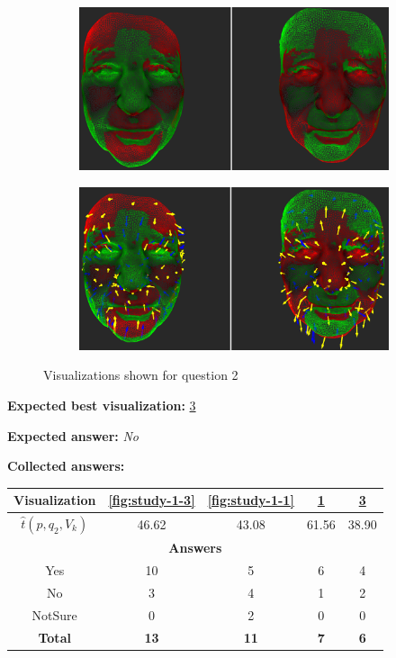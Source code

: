 \begin{figure}[h]
\begin{subfigure}{0.49\textwidth}
\includegraphics[width=\textwidth]{./img-study/pair2.PNG}
\caption{}
\label{fig:study-1-2}
\end{subfigure}
\begin{subfigure}{0.49\textwidth}
\includegraphics[width=\textwidth]{./img-study/pair4.PNG}
\caption{}
\label{fig:study-1-4}
\end{subfigure}
\caption{Visualizations shown for question 2}
\end{figure}
\medskip

{\bf Expected best visualization:} \ref{fig:study-1-4}
\medskip

{\bf Expected answer:} {\it No}
\medskip

{\bf Collected answers:}

\begin{center}
\begin{tabular}{| c | c | c | c | c |}
	\hline
	Visualization & \ref{fig:study-1-3} & \ref{fig:study-1-1} & \ref{fig:study-1-2} & \ref{fig:study-1-4}\\ \hline
	\(\widehat{t}(p, q_2, V_k)\) & 46.62 & 43.08 & 61.56 & 38.90\\ \hline
	\multicolumn{5}{|c|}{\bf Answers} \\ \hline
	Yes & 10 & 5 & 6 & 4\\ \hline
	\rowcolor{yellow!30} No & 3 & 4 & 1 & 2\\ \hline
	NotSure & 0 & 2 & 0 & 0\\ \hline
	{\bf Total} & {\bf 13} & {\bf 11} & {\bf 7} & {\bf 6}\\ \hline
\end{tabular}
\end{center}

